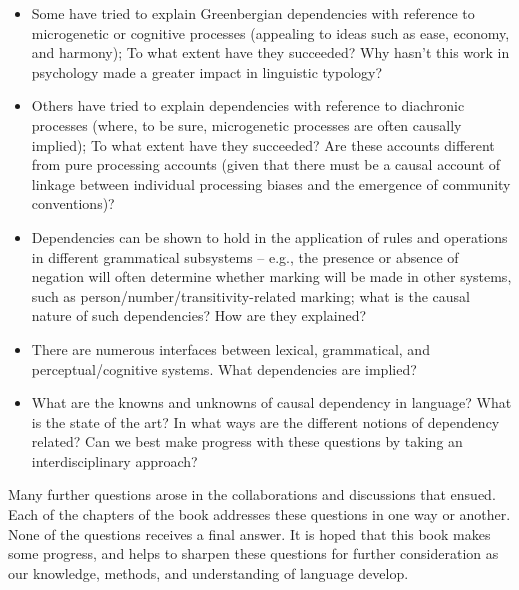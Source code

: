\documentclass[output=paper]{langsci/langscibook}
\begin{document}
\begin{itemize}
\item Some have tried to explain Greenbergian dependencies with reference to microgenetic or cognitive processes (appealing to ideas such as ease, economy, and harmony); To what extent have they succeeded? Why hasn’t this work in psychology made a greater impact in linguistic typology?

\item Others have tried to explain dependencies with reference to diachronic processes (where, to be sure, microgenetic processes are often causally implied); To what extent have they succeeded? Are these accounts different from pure processing accounts (given that there must be a causal account of linkage between individual processing biases and the emergence of community conventions)?

\item Dependencies can be shown to hold in the application of rules and operations in different grammatical subsystems -- e.g., the presence or absence of negation will often determine whether marking will be made in other systems, such as person/number/transitivity-related marking; what is the causal nature of such dependencies? How are they explained?

\item There are numerous interfaces between lexical, grammatical, and perceptual/cognitive systems. What dependencies are implied?

\item What are the knowns and unknowns of causal dependency in language? What is the state of the art? In what ways are the different notions of dependency related? Can we best make progress with these questions by taking an interdisciplinary approach?
\end{itemize}

Many further questions arose in the collaborations and discussions that ensued. Each of the chapters of the book addresses these questions in one way or another. None of the questions receives a final answer. It is hoped that this book makes some progress, and helps to sharpen these questions for further consideration as our knowledge, methods, and understanding of language develop.
 
\printbibliography[heading=subbibliography,notkeyword=this]
\end{document}
